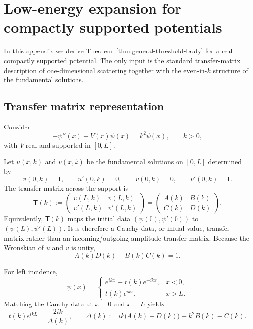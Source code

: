 \documentclass[aps,pra,preprint,notitlepage,nofootinbib]{revtex4-2}
\begin{document}
\appendix

\section{Low-energy expansion for compactly supported potentials}
\label{app:low-energy}

In this appendix we derive Theorem~\ref{thm:general-threshold-body} for a real compactly supported potential. The only input is the standard transfer-matrix description of one-dimensional scattering together with the even-in-$k$ structure of the fundamental solutions.

\subsection{Transfer matrix representation}

Consider
\begin{equation}
-\psi''(x)+V(x)\psi(x)=k^2\psi(x),
\qquad k>0,
\label{eq:app-sch}
\end{equation}
with $V$ real and supported in $[0,L]$.

Let $u(x,k)$ and $v(x,k)$ be the fundamental solutions on $[0,L]$ determined by
\begin{equation}
u(0,k)=1,
\qquad u'(0,k)=0,
\qquad
v(0,k)=0,
\qquad v'(0,k)=1.
\label{eq:uv-initial}
\end{equation}
The transfer matrix across the support is
\begin{equation}
\mathsf T(k):=
\begin{pmatrix}
u(L,k) & v(L,k)\\
u'(L,k) & v'(L,k)
\end{pmatrix}
=
\begin{pmatrix}
A(k) & B(k)\\
C(k) & D(k)
\end{pmatrix}.
\label{eq:T-def}
\end{equation}
Equivalently, \(\mathsf T(k)\) maps the initial data
\((\psi(0),\psi'(0))\) to \((\psi(L),\psi'(L))\). It is therefore a
Cauchy-data, or initial-value, transfer matrix rather than an
incoming/outgoing amplitude transfer matrix.
Because the Wronskian of $u$ and $v$ is unity,
\begin{equation}
A(k)D(k)-B(k)C(k)=1.
\label{eq:det-one}
\end{equation}

For left incidence,
\begin{equation}
\psi(x)=
\begin{cases}
e^{ikx}+r(k)e^{-ikx}, & x<0,\\
t(k)e^{ikx}, & x>L.
\end{cases}
\label{eq:scatt-ansatz-app}
\end{equation}
Matching the Cauchy data at $x=0$ and $x=L$ yields
\begin{equation}
t(k)e^{ikL}
=
\frac{2ik}{\Delta(k)},
\qquad
\Delta(k):=
ik\big(A(k)+D(k)\big)+k^2 B(k)-C(k).
\label{eq:t-transfer}
\end{equation}
\end{document}
